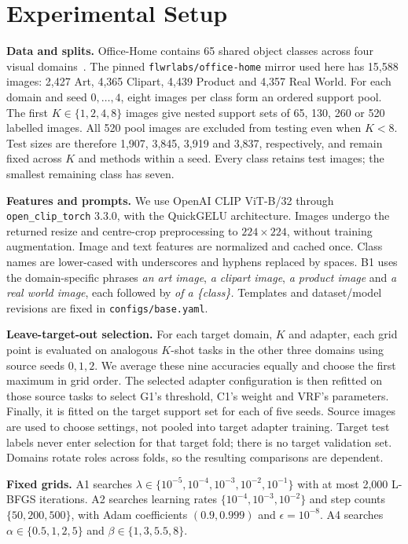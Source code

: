 \section{Experimental Setup}
\label{sec:setup}
\textbf{Data and splits.}
Office-Home contains 65 shared object classes across four visual domains~\citep{venkateswara2017officehome}. The pinned \texttt{flwrlabs/office-home} mirror used here has 15,588 images: 2,427 Art, 4,365 Clipart, 4,439 Product and 4,357 Real World. For each domain and seed $0,\ldots,4$, eight images per class form an ordered support pool. The first $K\in\{1,2,4,8\}$ images give nested support sets of 65, 130, 260 or 520 labelled images. All 520 pool images are excluded from testing even when $K<8$. Test sizes are therefore 1,907, 3,845, 3,919 and 3,837, respectively, and remain fixed across $K$ and methods within a seed. Every class retains test images; the smallest remaining class has seven.

\textbf{Features and prompts.}
We use OpenAI CLIP ViT-B/32 through \texttt{open\_clip\_torch} 3.3.0, with the QuickGELU architecture. Images undergo the returned resize and centre-crop preprocessing to $224\times224$, without training augmentation. Image and text features are normalized and cached once. Class names are lower-cased with underscores and hyphens replaced by spaces. B1 uses the domain-specific phrases \emph{an art image}, \emph{a clipart image}, \emph{a product image} and \emph{a real world image}, each followed by \emph{of a \{class\}.} Templates and dataset/model revisions are fixed in \texttt{configs/base.yaml}.

\textbf{Leave-target-out selection.}
For each target domain, $K$ and adapter, each grid point is evaluated on analogous $K$-shot tasks in the other three domains using source seeds $0,1,2$. We average these nine accuracies equally and choose the first maximum in grid order. The selected adapter configuration is then refitted on those source tasks to select G1's threshold, C1's weight and VRF's parameters. Finally, it is fitted on the target support set for each of five seeds. Source images are used to choose settings, not pooled into target adapter training. Target test labels never enter selection for that target fold; there is no target validation set. Domains rotate roles across folds, so the resulting comparisons are dependent.

\textbf{Fixed grids.}
A1 searches $\lambda\in\{10^{-5},10^{-4},10^{-3},10^{-2},10^{-1}\}$ with at most 2,000 L-BFGS iterations. A2 searches learning rates $\{10^{-4},10^{-3},10^{-2}\}$ and step counts $\{50,200,500\}$, with Adam coefficients $(0.9,0.999)$ and $\epsilon=10^{-8}$. A4 searches $\alpha\in\{0.5,1,2,5\}$ and $\beta\in\{1,3,5.5,8\}$.

